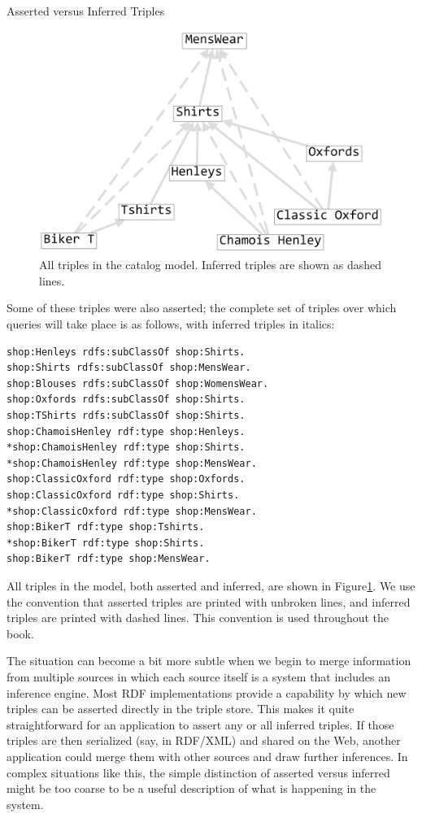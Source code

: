 \begin{example}{Asserted versus Inferred Triples}
\begin{figure}
\centering
\includegraphics[width=5in]{SWWOv3/media/ch7/figure7-3.png}
\caption{All triples in the catalog model. Inferred triples are shown as dashed
lines.}
\label{fig:ch7.3}
\end{figure}



Some of these triples were also asserted; the complete set of triples
over which queries will take place is as follows, with inferred triples
in italics:

\begin{lstlisting}
shop:Henleys rdfs:subClassOf shop:Shirts.
shop:Shirts rdfs:subClassOf shop:MensWear.
shop:Blouses rdfs:subClassOf shop:WomensWear.
shop:Oxfords rdfs:subClassOf shop:Shirts.
shop:TShirts rdfs:subClassOf shop:Shirts.
shop:ChamoisHenley rdf:type shop:Henleys.
*shop:ChamoisHenley rdf:type shop:Shirts.
*shop:ChamoisHenley rdf:type shop:MensWear.
shop:ClassicOxford rdf:type shop:Oxfords.
shop:ClassicOxford rdf:type shop:Shirts.
*shop:ClassicOxford rdf:type shop:MensWear.
shop:BikerT rdf:type shop:Tshirts.
*shop:BikerT rdf:type shop:Shirts.
shop:BikerT rdf:type shop:MensWear.
\end{lstlisting}


All triples in the model, both asserted and inferred, are shown in
Figure\ref{fig:ch7.3}. We use the convention that asserted triples are printed with
unbroken lines, and inferred triples are printed with dashed lines. This
convention is used throughout the book.
\end{example}

The situation can become a bit more subtle when we begin to merge
information from multiple sources in which each source itself is a
system that includes an inference engine. Most RDF implementations
provide a capability by which new triples can be asserted directly in
the triple store. This makes it quite straightforward for an application
to assert any or all inferred triples. If those triples are then
serialized (say, in RDF/XML) and shared on the Web, another application
could merge them with other sources and draw further inferences. In
complex situations like this, the simple distinction of asserted versus
inferred might be too coarse to be a useful description of what is
happening in the system.

